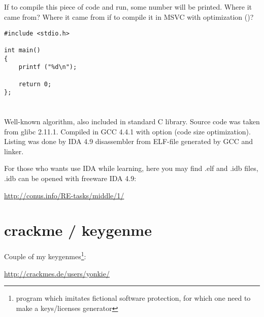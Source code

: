 \subsection{}

{If to compile this piece of code and run, some number will be printed. Where it came from?
Where it came from if to compile it in MSVC with optimization (\Ox)?}

\begin{lstlisting}
#include <stdio.h>

int main()
{
	printf ("%d\n");

	return 0;
};
\end{lstlisting}

\section{}

\subsection{}

{Well-known algorithm, also included in standard C library. Source code was taken from glibc 2.11.1.
Compiled in GCC 4.4.1 with  option (code size optimization).
Listing was done by IDA 4.9 disassembler from ELF-file generated by GCC and linker.}

{For those who wants use IDA while learning, here you may find .elf and .idb files,
.idb can be opened with freeware IDA 4.9:}

\url{http://conus.info/RE-tasks/middle/1/}



\section{crackme / keygenme}

{Couple of my keygenmes\footnote{program which imitates fictional software protection, 
for which one need to make a keys/licenses generator}:}

\url{http://crackmes.de/users/yonkie/}

